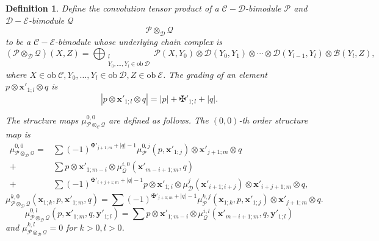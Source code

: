 \documentclass[11pt]{amsproc}
\def\B{\mathcal{B}}
\def\cP{\mathcal{P}}
\def\cQ{\mathcal{Q}}
\def\cc{\mathcal{C}}
\def\dd{\mathcal{D}}
\def\ee{\mathcal{E}}
\def\ob{\mathrm{ob\ }}
\newtheorem{defn}[lem]{Definition}
\theoremstyle{remark}
\numberwithin{equation}{section}
\begin{document}
\begin{defn}\label{def: convolution tensor product}
Define the convolution tensor product of a $\cc-\dd$-bimodule $\cP$ and $\dd-\ee$-bimodule $\cQ$
\begin{equation}
\cP \otimes_{\dd} \cQ
\end{equation}
to be a $\cc-\ee$-bimodule whose underlying chain complex is
\begin{equation}
(\cP \otimes_{\dd} \cQ)(X, Z) = \bigoplus_{\substack{l \\ Y_{0}, \ldots, Y_{l} \in \ob \dd}} \cP(X, Y_{0}) \otimes \dd(Y_{0}, Y_{1}) \otimes \cdots \otimes \dd(Y_{l-1}, Y_{l}) \otimes \B(Y_{l}, Z),
\end{equation}
where $X \in \ob \cc, Y_{0}, \ldots, Y_{l} \in \ob \dd, Z \in \ob \ee$.
The grading of an element $p \otimes \mathbf{x}'_{1;l} \otimes q$ is 
\begin{equation}\label{grading on convolution tensor product}
|p \otimes \mathbf{x}'_{1;l} \otimes q| = |p| + \maltese'_{1;l} + |q|.
\end{equation}

The structure maps $\mu_{\cP \otimes_{\cc} \cQ}^{0, 0}$ are defined as follows.
The $(0, 0)$-th order structure map is
\begin{equation}\label{structure maps for convolution of bimodules 0}
\begin{split}
\mu_{\cP \otimes_{\dd} \cQ}^{0, 0} = & \sum (-1)^{\maltese'_{j+1;m} + |q| - 1} \mu_{\cP}^{0, j}(p, \mathbf{x}'_{1;j}) \otimes \mathbf{x}'_{j+1; m} \otimes q \\
+ & \sum p \otimes \mathbf{x}'_{1; m-i} \otimes \mu_{\cQ}^{i, 0}(\mathbf{x}'_{m-i+1;m}, q) \\
+ & \sum (-1)^{\maltese'_{i+j+1;m} +|q| - 1} p \otimes \mathbf{x}'_{1;i} \otimes \mu_{\dd}^{j}(\mathbf{x}'_{i+1;i+j}) \otimes \mathbf{x}'_{i+j+1;m} \otimes q,
\end{split}
\end{equation}
\begin{equation}\label{structure maps for convolution of bimodules 1}
\mu_{\cP \otimes_{\dd} \cQ}^{k, 0}(\mathbf{x}_{1;k}, p, \mathbf{x}'_{1;m}, q) = \sum (-1)^{\maltese'_{j+1;m} + |q| - 1} \mu_{\cP}^{k, j}(\mathbf{x}_{1;k}, p, \mathbf{x}'_{1;j}) \otimes \mathbf{x}'_{j+1;m} \otimes q.
\end{equation}
\begin{equation}\label{structure maps for convolution of bimodules 2}
\mu_{\cP \otimes_{\dd} \cQ}^{0, l}(p, \mathbf{x}'_{1;m}, q, \mathbf{y}'_{1; l})= \sum p \otimes \mathbf{x}'_{1;m-i} \otimes \mu_{\cQ}^{i, l}(\mathbf{x}'_{m-i+1;m}, q, \mathbf{y}'_{1;l})
\end{equation}
and $\mu_{\cP \otimes_{\dd} \cQ}^{k, l} = 0$ for $k>0, l>0$.
\end{defn}
\end{document}
